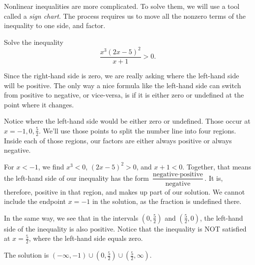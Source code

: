 \documentclass{ximera}
\begin{document}
Nonlinear inequalities are more complicated.  To solve them, we will use a tool called a \emph{sign chart}.
The process requires us to move all the nonzero terms of the inequality to one side, and factor.
\begin{example}
	Solve the inequality \[ \dfrac{x^3 \left(2x-5\right)^2}{x+1} > 0.\]

	\begin{explanation}
		Since the right-hand side is zero, we are really asking where the left-hand side will be positive.  The only way
		a nice formula like the left-hand side can switch from positive to negative, or vice-versa, is if it is either zero
		or undefined at the point where it changes.

		Notice where the left-hand side would be either zero or undefined.  Those occur at $x = -1, 0, \frac{5}{2}$.  
		We'll use those points to split the number line into four regions. Inside each of those regions, our factors are either
		always positive or always negative.
		
		
		For $x < -1$, we find $x^3 < 0$, $(2x-5)^2 > 0$, and $x+1 < 0$.  Together, that means the left-hand side of our inequality has the form 
		$\displaystyle \dfrac{ \textrm{negative} \cdot \textrm{positive}}{\textrm{negative}}$.  It is, therefore, positive in that region, and makes up
		part of our solution.  We cannot include the endpoint $x=-1$ in the solution, as the fraction is undefined there.
		
		In the same way, we see that in the intervals $\left( 0, \frac{5}{2} \right)$ and $\left( \frac{5}{2}, 0\right)$, the left-hand side of the inequality is also positive.
		Notice that the inequality is NOT satisfied at $x=\frac{5}{2}$, where the left-hand side equals zero.  
		
		The solution is $\left( -\infty, -1 \right) \cup \left( 0, \frac{5}{2} \right) \cup \left( \frac{5}{2}, \infty \right)$.
	\end{explanation}
\end{example}
\end{document}
